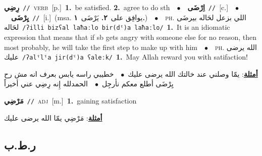 \documentclass[10pt,a4paper,twoside]{article} %
\begin{document}
\begin{multicols}{2}
{\setlength\topsep{0pt}\textbf{\foreignlanguage{arabic}{رِضِي}}\ {\color{gray}\texttt{//}\color{black}}\ \textsc{verb}\ [p.]\ \textbf{1.}~be satisfied.  \textbf{2.}~agree to do sth\ \ $\bullet$\ \ \setlength\topsep{0pt}\textbf{\foreignlanguage{arabic}{اِرْضَى}}\ {\color{gray}\texttt{//}\color{black}}\ [c.]\ \ $\bullet$\ \ \setlength\topsep{0pt}\textbf{\foreignlanguage{arabic}{يِرْضَى}}\ {\color{gray}\texttt{//}\color{black}}\ [i.]\ \color{gray}(msa. \foreignlanguage{arabic}{يوافِق على}~\foreignlanguage{arabic}{\textbf{٢.}}  \foreignlanguage{arabic}{يَرْضَى}~\foreignlanguage{arabic}{\textbf{١.}})\color{black}\ \ $\bullet$\ \ \textsc{ph.} \color{gray} \foreignlanguage{arabic}{اللي بزعل لحَاله بيرضَى لحَاله}\color{black}\ {\color{gray}\texttt{/{\sffamily ʔilli bizʕal laħaːlo bir(dˤ)a laħaːlo}/}\color{black}}\ \textbf{1.}~It is an idiomatic expression that means that if sb gets angry with someone else for no reason, then most probably, he will take the first step to make up with him\ \ $\bullet$\ \ \textsc{ph.} \color{gray} \foreignlanguage{arabic}{الله يرضى عليك}\color{black}\ {\color{gray}\texttt{/{\sffamily ʔalˤlˤa jir(dˤ)a ʕaleːk}/}\color{black}}\ \textbf{1.}~May Allah reward you with satifaction!\  \begin{flushright}\color{gray}\foreignlanguage{arabic}{\textbf{\underline{\foreignlanguage{arabic}{أمثلة}}}: يمّا وصلني عند خالتك الله يرضى عليك\ $\bullet$\ \  خطيبي راسه يابس بعرف انه مش رح يِرْضَى أطلع معكم نأرجِل\ $\bullet$\ \  الحمدلله إِنه رِضِي عني أخيراً}\end{flushright}\color{black}} \vspace{2mm}

{\setlength\topsep{0pt}\textbf{\foreignlanguage{arabic}{مَرْضِي}}\ {\color{gray}\texttt{//}\color{black}}\ \textsc{adj}\ [m.]\ \textbf{1.}~gaining satisfaction\  \begin{flushright}\color{gray}\foreignlanguage{arabic}{\textbf{\underline{\foreignlanguage{arabic}{أمثلة}}}: مَرْضِي يمّا الله يرضى عليك}\end{flushright}\color{black}} \vspace{2mm}

\vspace{-3mm}
\subsection*{\color{blue}\foreignlanguage{arabic}{ر.ط.ب}\color{blue}{}} 


\end{multicols}
\end{document}
